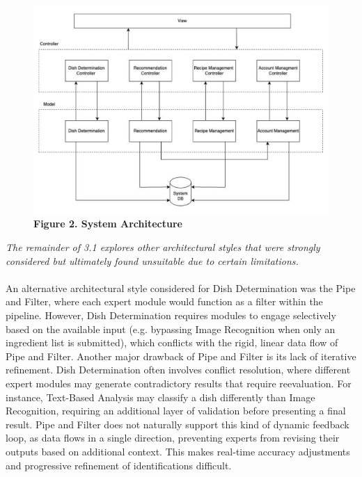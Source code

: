 \documentclass[]{article}
\begin{document}
\\
\\
\begin{figure}[H]
    \centering
    \includegraphics[width=\textwidth]{image/3.1_system_arch.pdf}
    \caption{\textbf{Figure 2. System Architecture}}
\end{figure}
\textit{The remainder of  3.1 explores other architectural styles that were strongly considered but ultimately found unsuitable due to certain limitations.}
\\
\\
An alternative architectural style considered for Dish Determination was the Pipe and Filter, where each expert module would function as a filter within the pipeline. However, Dish Determination requires modules to engage selectively based on the available input (e.g. bypassing Image Recognition when only an ingredient list is submitted), which conflicts with the rigid, linear data flow of Pipe and Filter. Another major drawback of Pipe and Filter is its lack of iterative refinement. Dish Determination often involves conflict resolution, where different expert modules may generate contradictory results that require reevaluation. For instance, Text-Based Analysis may classify a dish differently than Image Recognition, requiring an additional layer of validation before presenting a final result. Pipe and Filter does not naturally support this kind of dynamic feedback loop, as data flows in a single direction, preventing experts from revising their outputs based on additional context. This makes real-time accuracy adjustments and progressive refinement of identifications difficult.
\\
\\
\end{document}
